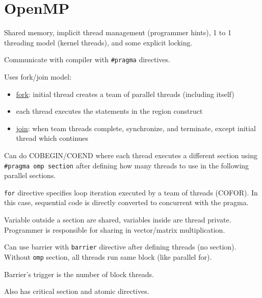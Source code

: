 \documentclass[11pt]{article}
\begin{document}
\section{OpenMP}
\label{sec:org549f45c}
Shared memory, implicit thread management (programmer hints), 1 to 1 threading model
(kernel threads), and some explicit locking.

Communicate with compiler with \texttt{\#pragma} directives.

Uses fork/join model:
\begin{itemize}
\item \uline{fork}: initial thread creates a team of parallel threads (including itself)
\item each thread executes the statements in the region construct
\item \uline{join}: when team threads complete, synchronize, and terminate, except initial
thread which continues
\end{itemize}

Can do COBEGIN/COEND where each thread executes a different section using
\texttt{\#pragma omp section} after defining how many threads to use in the following
parallel sections.

\texttt{for} directive specifies loop iteration executed by a team of threads (COFOR).
In this case, sequential code is directly converted to concurrent with the
pragma.

Variable outside a section are shared, variables inside are thread private.
Programmer is responsible for sharing in vector/matrix multiplication.

Can use barrier with \texttt{barrier} directive after defining threads (no section).
Without \texttt{omp} section, all threads run same block (like parallel for).

Barrier's trigger is the number of block threads.

Also has critical section and atomic directives.
\end{document}
